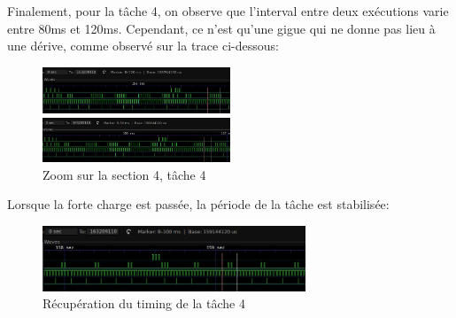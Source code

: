 \documentclass[11pt, a4paper]{article}
\begin{document}
Finalement, pour la tâche 4, on observe que l'interval entre deux exécutions varie entre 80ms et 120ms.
Cependant, ce n'est qu'une gigue qui ne donne pas lieu à une dérive, comme observé sur la trace ci-dessous:

\begin{figure}[H]
    \begin{multicols}{2}
        \begin{center}
            \includegraphics[width=0.5\textwidth]{section4_send_t4_leds_2}
        \end{center}
        \columnbreak
        \begin{center}
            \includegraphics[width=0.5\textwidth]{section4_send_t4_leds_3}
        \end{center}
    \end{multicols}
    \caption{Zoom sur la section 4, tâche 4}
    \label{Zoom sur la section 4, tâche 4}
\end{figure}

Lorsque la forte charge est passée, la période de la tâche est stabilisée:

\begin{figure}[H]
    \begin{center}
        \includegraphics[width=0.7\textwidth]{section4_send_t4_leds_5}
    \end{center}
    \caption{Récupération du timing de la tâche 4}
    \label{Récupération du timing de la tâche 4}
\end{figure}
\end{document}
